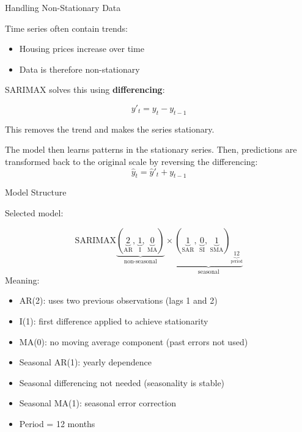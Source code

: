 \documentclass[slidescentered]{beamer}
\begin{document}
\begin{frame}{Handling Non-Stationary Data}

    Time series often contain trends:

    \begin{itemize}
        \item Housing prices increase over time
        \item Data is therefore non-stationary
    \end{itemize}

    SARIMAX solves this using \textbf{differencing}:

    \[
        y'_t = y_t - y_{t-1}
    \]

    This removes the trend and makes the series stationary.

    The model then learns patterns in the stationary series.
    Then, predictions are transformed back to the original scale by reversing the differencing:
    \[
        \hat{y}_t = \hat{y}'_t + y_{t-1}
    \]

\end{frame}



\begin{frame}{Model Structure}

    Selected model:

    \[
        \text{SARIMAX}
        \!\underbrace{(
        \underbrace{2}_{\text{AR}},\,
        \underbrace{1}_{\text{I}},\,
        \underbrace{0}_{\text{MA}}
        )}_{\text{non-seasonal}}
        \times
        \underbrace{(
        \underbrace{1}_{\text{SAR}},\,
        \underbrace{0}_{\text{SI}},\,
        \underbrace{1}_{\text{SMA}}
        )_{\underbrace{12}_{\text{period}}}}_{\text{seasonal}}
    \] Meaning:

    \begin{itemize}
        \item AR(2): uses two previous observations (lags 1 and 2)
        \item I(1): first difference applied to achieve stationarity
        \item MA(0): no moving average component (past errors not used)
        \item Seasonal AR(1): yearly dependence
        \item Seasonal differencing not needed (seasonality is stable)
        \item Seasonal MA(1): seasonal error correction
        \item Period = 12 months
    \end{itemize}

\end{frame}
\end{document}
